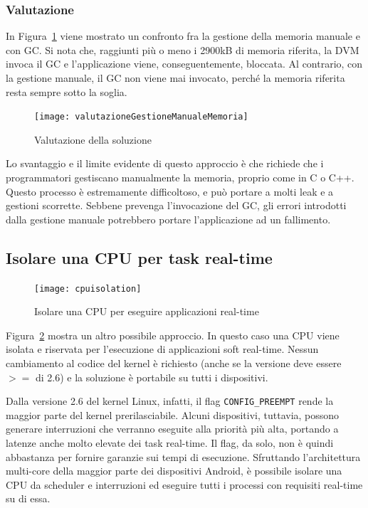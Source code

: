 \subsubsection{Valutazione}
In Figura~\ref{fig:valutazionegestionemanualememoria} viene mostrato un confronto fra la gestione della memoria manuale e con GC. Si nota che, raggiunti più o meno i 2900kB di memoria riferita, la DVM invoca il GC e l'applicazione viene, conseguentemente, bloccata. Al contrario, con la gestione manuale, il GC non viene mai invocato, perché la memoria riferita resta sempre sotto la soglia.
\begin{figure}[h]
	\centering
	\texttt{[image: valutazioneGestioneManualeMemoria]}
	\caption{Valutazione della soluzione}
	\label{fig:valutazionegestionemanualememoria}
\end{figure}

Lo svantaggio e il limite evidente di questo approccio è che richiede che i programmatori gestiscano manualmente la memoria, proprio come in C o C++. Questo processo è estremamente difficoltoso, e può portare a molti leak e a gestioni scorrette. Sebbene prevenga l'invocazione del GC, gli errori introdotti dalla gestione manuale potrebbero portare l'applicazione ad un fallimento.

\subsection{Isolare una CPU per task real-time}
\begin{figure}[h]
	\centering
	\texttt{[image: cpuisolation]}
	\caption{Isolare una CPU per eseguire applicazioni real-time}
	\label{fig:cpuisolation}
\end{figure}
Figura~\ref{fig:cpuisolation} mostra un altro possibile approccio. In questo caso una CPU viene isolata e riservata per l'esecuzione di applicazioni soft real-time. Nessun cambiamento al codice del kernel è richiesto (anche se la versione deve essere $>=$ di 2.6) e la soluzione è portabile su tutti i dispositivi.

Dalla versione 2.6 del kernel Linux, infatti, il flag \texttt{CONFIG\_PREEMPT} rende la maggior parte del kernel prerilasciabile. Alcuni dispositivi, tuttavia, possono generare interruzioni che verranno eseguite alla priorità più alta, portando a latenze anche molto elevate dei task real-time. Il flag, da solo, non è quindi abbastanza per fornire garanzie sui tempi di esecuzione. Sfruttando l'architettura multi-core della maggior parte dei dispositivi Android, è possibile isolare una CPU da scheduler e interruzioni ed eseguire tutti i processi con requisiti real-time su di essa. 

